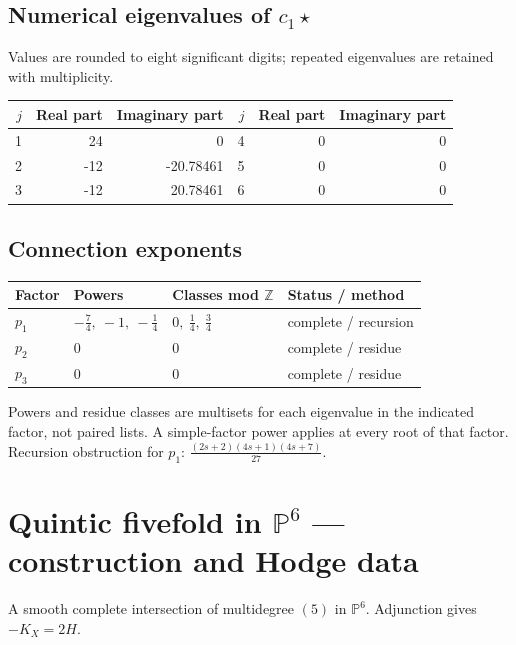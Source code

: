 \documentclass[10pt,a4paper]{article}
\begin{document}
\subsection*{Numerical eigenvalues of $c_1\star$}
Values are rounded to eight significant digits; repeated eigenvalues are retained with multiplicity.
\begin{center}\small\begin{tabular}{rrr@{\qquad}rrr}\toprule $j$ & Real part & Imaginary part & $j$ & Real part & Imaginary part\\\midrule
1 & 24 & 0 & 4 & 0 & 0\\
2 & -12 & -20.78461 & 5 & 0 & 0\\
3 & -12 & 20.78461 & 6 & 0 & 0\\
\bottomrule\end{tabular}\end{center}
\subsection*{Connection exponents}
\begin{center}\begin{tabular}{llll}\toprule Factor & Powers & Classes mod $\mathbb Z$ & Status / method\\\midrule
$p_{1}$ & $- \frac{7}{4},\ -1,\ - \frac{1}{4}$ & $0,\ \frac{1}{4},\ \frac{3}{4}$ & complete / recursion\\
$p_{2}$ & $0$ & $0$ & complete / residue\\
$p_{3}$ & $0$ & $0$ & complete / residue\\
\bottomrule\end{tabular}\end{center}
Powers and residue classes are multisets for each eigenvalue in the indicated factor, not paired lists. A simple-factor power applies at every root of that factor.
Recursion obstruction for $p_{1}$: $\frac{\left(2 s + 2\right) \left(4 s + 1\right) \left(4 s + 7\right)}{27}$.
\clearpage\section*{Quintic fivefold in $\mathbb P^{6}$ --- construction and Hodge data}\label{entry:PCI5-5}
A smooth complete intersection of multidegree $(5)$ in $\mathbb P^{6}$.
Adjunction gives $-K_X=2H$.
\end{document}
